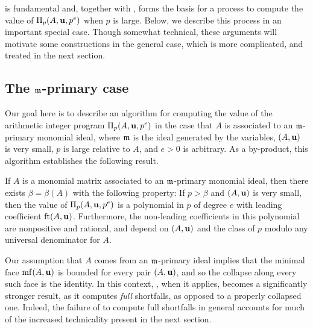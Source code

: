\documentclass[11pt]{amsart}
\begin{document}
 is fundamental and, together with , forms the basis for a process to compute the value of $\Pi_p(A, \mathbf{u}, p^e)$ when $p$ is large.  Below, we describe this process in an important special case.  Though somewhat technical, these arguments will motivate some constructions in the general case, which is more complicated, and treated in the next section.

\subsection{The $\mathfrak{m}$-primary case}
\label{m-primary: SS}
  Our goal here is to describe an algorithm for computing the value of the arithmetic integer program $\Pi_p(A,\mathbf{u}, p^e)$ in the case that $A$ is associated to an $\mathfrak{m}$-primary monomial ideal, where $\mathfrak{m}$ is the ideal generated by the variables, $(A,\mathbf{u})$ is very small, $p$ is large relative to $A$, and $e > 0$ is arbitrary.  As a by-product, this algorithm  establishes the following result.

\begin{theorem}
   \label{m-primary AIP: T}
   If $A$ is a monomial matrix associated to an $\mathfrak{m}$-primary monomial ideal, then there exists $\beta=\beta(A)$ with the following property\textup:
   If $p > \beta$ and $(A,\mathbf{u})$ is very small, then the value of $\Pi_p(A,\mathbf{u},p^e)$ is a polynomial in $p$ of degree $e$ with leading coefficient $\operatorname{ft}(A, \mathbf{u})$.
   Furthermore, the non-leading coefficients in this polynomial are nonpositive and rational, and depend on $(A,\mathbf{u})$ and the class of $p$ modulo any universal denominator for $A$.
\end{theorem}

Our assumption that $A$ comes from an $\mathfrak{m}$-primary ideal implies that the minimal face $\operatorname{mf}(A, \mathbf{u})$ is bounded for every pair $(A, \mathbf{u})$, and so the collapse along every such face is the identity.
In this context, , when it applies, becomes a significantly stronger result, as it computes \emph{full} shortfalls, as opposed to a properly collapsed one.
Indeed, the failure of  to compute full shortfalls in general accounts for much of the increased technicality present in the next section.
\end{document}
